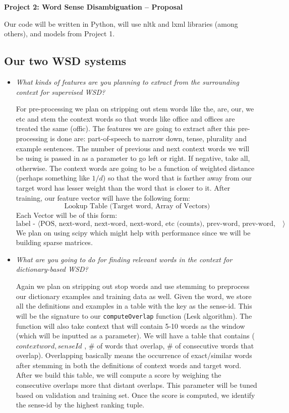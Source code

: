 \documentclass{article}
\begin{document}
\begin{center}\textbf{Project 2: Word Sense Disambiguation -- Proposal}\end{center}

Our code will be written in Python, will use nltk and lxml libraries (among others), and models from Project 1.

\subsection*{Our two WSD systems}

\begin{itemize}
\item \textit{What kinds of features are you planning to extract from the surrounding context for supervised WSD?}\par

For pre-processing we plan on stripping out stem words like the, are, our, we etc and stem the context words so that words like office and offices are treated the same (offic). The features we are going to extract after this pre-processing is done are: part-of-speech to narrow down, tense, plurality and example sentences. The number of previous and next context words we will be using is passed in as a parameter to go left or right. If negative, take all, otherwise. The context words are going to be a function of weighted distance (perhaps something like $1/d$) so that the word that is farther away from our target word has lesser weight than the word that is closer to it. After training, our feature vector will have the following form:
\[\text{Lookup Table (Target word, Array of Vectors)}\]
Each Vector will be of this form:
\[\text{label - $\langle$POS, next-word, next-word, next-word, etc (counts), prev-word, prev-word, etc (counts)$\rangle$}\]
We plan on using scipy which might help with performance since we will be building sparse matrices.

\item \textit{What are you going to do for finding relevant words in the context for
dictionary-based WSD?}\par

Again we plan on stripping out stop words and use stemming to preprocess our dictionary examples and training data as well. Given the word, we store all the definitions and examples in a table with the key as the sense-id. This will be the signature to our \texttt{computeOverlap} function (Lesk algorithm). The function will also take context that will contain 5-10 words as the window (which will be inputted as a parameter). We will have a table that contains (\(contextword, senseId\) , \# of words that overlap, \# of consecutive words that overlap). Overlapping basically means the occurrence of exact/similar words after stemming in both the definitions of context words and target word. After we build this table, we will compute a score by weighing the consecutive overlaps more that distant overlaps. This parameter will be tuned based on validation and training set. Once the score is computed, we identify the sense-id by the highest ranking tuple.


\end{itemize}
\end{document}
